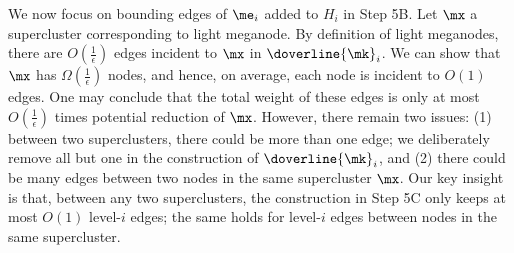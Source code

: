 We now focus on bounding edges of $\me_{i}$ added to $H_i$ in Step 5B.  Let $\mx$ a supercluster corresponding to light meganode. By definition of light meganodes, there are $O(\frac{1}{\epsilon})$ edges incident to $\mx$ in $\doverline{\mk}_i$. We can show that $\mx$ has $\Omega(\frac{1}{\epsilon})$ nodes, and hence, on average, each node is incident to $O(1)$ edges. One may conclude that the total weight of these edges is only at most $O(\frac{1}{\epsilon})$ times potential reduction of $\mx$. However, there remain two issues: (1) between two superclusters, there could be more than one edge; we deliberately remove all but one in the construction of $\doverline{\mk}_i$, and (2) there could be many edges between two nodes in the same supercluster $\mx$. Our key insight is that, between any two superclusters, the construction in Step 5C only keeps at most $O(1)$ level-$i$ edges; the same holds for level-$i$ edges between nodes in the same supercluster. 


